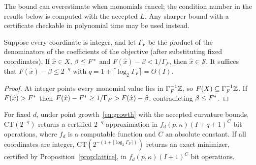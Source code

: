 The bound can overestimate when monomials cancel; the condition number in
the results below is computed with the accepted $L$. Any sharper bound with a
certificate checkable in polynomial time may be used instead.

\begin{proposition}\label{prop:lattice}
Suppose every coordinate is integer, and let $\Gamma_F$ be the product of
the denominators of the coefficients of the objective (after substituting
fixed coordinates). If $\hat x\in X$, $\beta\le F^{*}$ and
$F(\hat x)-\beta<1/\Gamma_F$, then $\hat x\in\mathcal S$. It suffices that
$F(\hat x)-\beta\le2^{-q}$ with $q=1+\lceil\log_2\Gamma_F\rceil=O(I)$.
\end{proposition}

\begin{proof}
At integer points every monomial value lies in $\Gamma_F^{-1}\mathbb Z$, so
$F(X)\subseteq\Gamma_F^{-1}\mathbb Z$. If $F(\hat x)>F^{*}$ then
$F(\hat x)-F^{*}\ge1/\Gamma_F>F(\hat x)-\beta$, contradicting $\beta\le F^{*}$.
\end{proof}

\begin{corollary}\label{cor:poly}
For fixed $d$, under point growth~\eqref{eq:growth} with the accepted
curvature bounds, CT$(2^{-q})$ returns a certified $2^{-q}$-approximation in
$f_d(p,\kappa)(I+q+1)^{C}$ bit operations, where $f_d$ is a computable
function and $C$ an absolute constant. If all coordinates are integer,
CT$(2^{-(1+\lceil\log_2\Gamma_F\rceil)})$ returns an exact minimizer, certified
by Proposition~\ref{prop:lattice}, in $f_d(p,\kappa)(I+1)^C$ bit operations.
\end{corollary}

